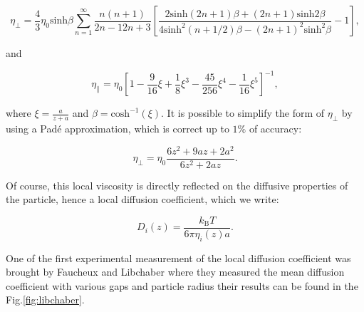 \begin{equation}
	\eta_\bot = \frac{4}{3} \eta_0 \mathrm{sinh}\beta \sum _{n=1} ^{\infty} \frac{n(n+1)}{{2n-1}{2n+3}}
	\left[
	\frac
	{
		2\mathrm{sinh}(2n + 1)\beta + (2n +1)\mathrm{sinh}2\beta
	}
	{
		4\mathrm{sinh}^2(n + 1 /2)\beta  - (2n+1)^2 \mathrm{sinh}^2 \beta
	}
	-1
	\right] ,
	\label{Eq:etaz}
\end{equation}

and 

\begin{equation}
	\eta_\parallel = \eta_0 
	\left[
		1 - \frac{9}{16} \xi + \frac{1}{8}\xi^3 - \frac{45}{256}\xi^4 - \frac{1}{16}\xi^5
	\right]^{-1},
	\label{Eq:etax}
\end{equation}

where $\xi = \frac{a}{z+a}$ and $\beta = \mathrm{cosh}^{-1}(\xi)$. It is possible to simplify the form of $\eta_\bot$ by using a Padé approximation, which is correct up to $1\%$ of accuracy:

\begin{equation}
	\eta_\bot = \eta_0 \frac{6z^2 + 9az + 2a^2}{6z^2 + 2az}.
\end{equation}

Of course, this local viscosity is directly reflected on the diffusive properties of the particle, hence a local diffusion coefficient, which we write:

\begin{equation}
	D_i (z) = \frac{k_\mathrm{B} T}{6\pi\eta_i (z) a}.
\end{equation}

One of the first experimental measurement of the local diffusion coefficient was brought by Faucheux and Libchaber \cite{faucheux_confined_1994} where they measured the mean diffusion coefficient with various gaps and particle radius their results can be found in the Fig.\ref{fig:libchaber}.

